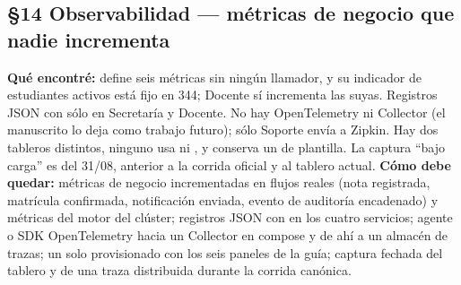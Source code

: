 \subsection*{\S14 Observabilidad --- m\'etricas de negocio que nadie incrementa}
\textbf{Qu\'e encontr\'e:}  define seis m\'etricas  sin ning\'un llamador, y su indicador de estudiantes activos est\'a fijo en 344; Docente s\'i incrementa las suyas. Registros JSON con  s\'olo en Secretar\'ia y Docente. No hay OpenTelemetry ni Collector (el manuscrito lo deja como trabajo futuro); s\'olo Soporte env\'ia a Zipkin. Hay dos tableros distintos, ninguno usa  ni , y  conserva un  de plantilla. La captura ``bajo carga'' es del 31/08, anterior a la corrida oficial y al tablero actual. \textbf{C\'omo debe quedar:} m\'etricas de negocio incrementadas en flujos reales (nota registrada, matr\'icula confirmada, notificaci\'on enviada, evento de auditor\'ia encadenado) y m\'etricas del motor del cl\'uster; registros JSON con  en los cuatro servicios; agente o SDK OpenTelemetry hacia un Collector en compose y de ah\'i a un almac\'en de trazas; un solo  provisionado con los seis paneles de la gu\'ia; captura fechada del tablero y de una traza distribuida durante la corrida can\'onica.

